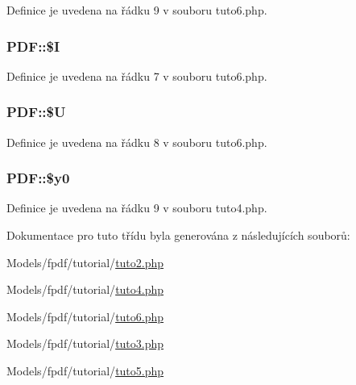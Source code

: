 Definice je uvedena na řádku 9 v souboru tuto6.\-php.

\hypertarget{class_p_d_f_aec6324527baba848fc71d967ca926462}{
\subsubsection[{\$\-I}]{\setlength{\rightskip}{0pt plus 5cm}P\-D\-F\-::\$\-I}}\label{class_p_d_f_aec6324527baba848fc71d967ca926462}


Definice je uvedena na řádku 7 v souboru tuto6.\-php.

\hypertarget{class_p_d_f_a0799d169791740052c6f15ef41a5bc0d}{
\subsubsection[{\$\-U}]{\setlength{\rightskip}{0pt plus 5cm}P\-D\-F\-::\$\-U}}\label{class_p_d_f_a0799d169791740052c6f15ef41a5bc0d}


Definice je uvedena na řádku 8 v souboru tuto6.\-php.

\hypertarget{class_p_d_f_a2bce2f1644faa0a0a5d3af1660728725}{
\subsubsection[{\$y0}]{\setlength{\rightskip}{0pt plus 5cm}P\-D\-F\-::\$y0}}\label{class_p_d_f_a2bce2f1644faa0a0a5d3af1660728725}


Definice je uvedena na řádku 9 v souboru tuto4.\-php.



Dokumentace pro tuto třídu byla generována z následujících souborů\-:\begin{DoxyCompactItemize}
\item 
Models/fpdf/tutorial/\hyperlink{tuto2_8php}{tuto2.\-php}\item 
Models/fpdf/tutorial/\hyperlink{tuto4_8php}{tuto4.\-php}\item 
Models/fpdf/tutorial/\hyperlink{tuto6_8php}{tuto6.\-php}\item 
Models/fpdf/tutorial/\hyperlink{tuto3_8php}{tuto3.\-php}\item 
Models/fpdf/tutorial/\hyperlink{tuto5_8php}{tuto5.\-php}\end{DoxyCompactItemize}
